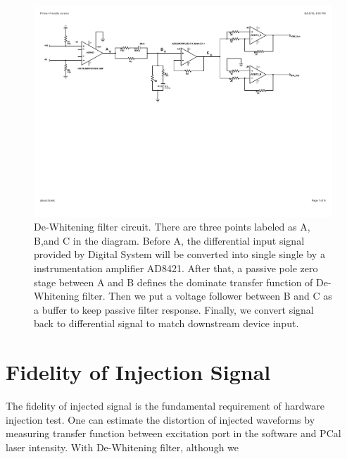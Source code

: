 \begin{figure}
\includegraphics[width=1\textwidth]{figure/DEWcircuit.pdf}
\caption[De-Whitening filter circuit]{De-Whitening filter circuit. There are three points labeled as A, B,and C in the diagram. Before A, the differential input signal provided by Digital System will be converted into single single by a instrumentation amplifier AD8421. After that, a passive pole zero stage between A and B defines the dominate transfer function of De-Whitening filter. Then we put a voltage follower between B and C as a buffer to keep passive filter response. Finally, we convert signal back to differential signal to match downstream device input. }\label{fig:dewcircuit}
\end{figure}



\section{Fidelity of Injection Signal}
The fidelity of injected signal is the fundamental requirement of hardware injection test. One can estimate the distortion of injected waveforms by measuring transfer function between excitation port in the software and PCal laser intensity. With De-Whitening filter, although we 

